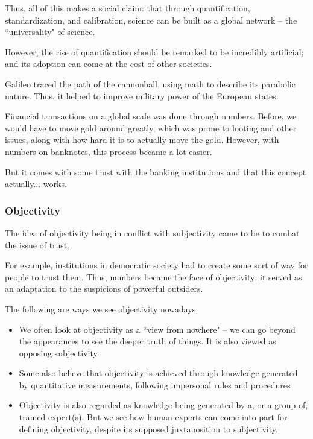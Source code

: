 \documentclass[openany]{book}
\begin{document}
Thus, all of this makes a social claim: that through quantification, standardization, and calibration, science can be built as a global network -- the ``universality" of science.

However, the rise of quantification should be remarked to be incredibly artificial; and its adoption can come at the cost of other societies.

\begin{example}
	Galileo traced the path of the cannonball, using math to describe its parabolic nature. Thus, it helped to improve military power of the European states.
\end{example}

\begin{example}
	Financial transactions on a global scale was done through numbers. Before, we would have to move gold around greatly, which was prone to looting and other issues, along with how hard it is to actually move the gold. However, with numbers on banknotes, this process became a lot easier.
	
	But it comes with some trust with the banking institutions and that this concept actually... works.
\end{example}

\subsubsection{Objectivity}
The idea of objectivity being in conflict with subjectivity came to be to combat the issue of trust.

For example, institutions in democratic society had to create some sort of way for people to trust them. Thus, numbers became the face of objectivity: it served as an adaptation to the suspicions of powerful outsiders.

The following are ways we see objectivity nowadays:
\begin{itemize}
	\item We often look at objectivity as a ``view from nowhere" -- we can go beyond the appearances to see the deeper truth of things. It is also viewed as opposing subjectivity.
	
	\item Some also believe that objectivity is achieved through knowledge generated by quantitative measurements, following impersonal rules and procedures
	
	\item Objectivity is also regarded as knowledge being generated by a, or a group of, trained expert(s). But we see how human experts can come into part for defining objectivity, despite its supposed juxtaposition to subjectivity.
\end{itemize}
\end{document}

